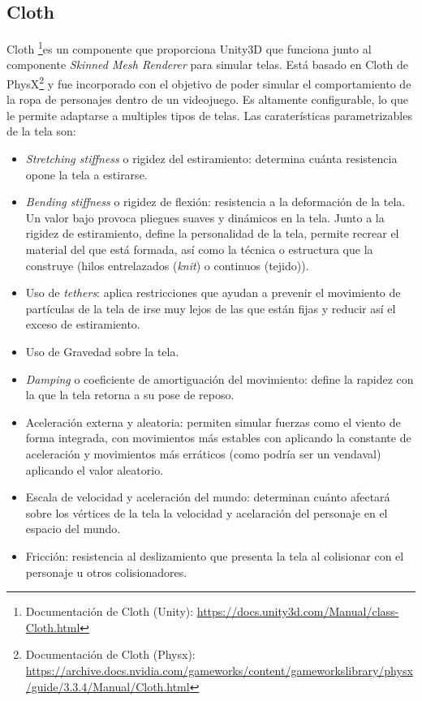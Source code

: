 \subsection{Cloth}
\label{subsec:cloth}
Cloth \footnote{Documentación de Cloth (Unity): \url{https://docs.unity3d.com/Manual/class-Cloth.html}}es un componente que proporciona Unity3D que funciona junto al componente \textit{Skinned Mesh Renderer} para simular telas. Está basado en Cloth de PhysX\footnote{Documentación de Cloth (Physx): \url{https://archive.docs.nvidia.com/gameworks/content/gameworkslibrary/physx/guide/3.3.4/Manual/Cloth.html}} y fue incorporado con el objetivo de poder simular el comportamiento de la ropa de personajes dentro de un videojuego. Es altamente configurable, lo que le permite adaptarse a multiples tipos de telas. Las caraterísticas parametrizables de la tela son: 
\begin{itemize}
  \item \textit{Stretching stiffness} o rigidez del estiramiento: determina cuánta resistencia opone la tela a estirarse.
  \item \textit{Bending stiffness} o rigidez de flexión: resistencia a la deformación de la tela. Un valor bajo provoca pliegues suaves y dinámicos en la tela. Junto a la rigidez de estiramiento, define la personalidad de la tela, permite recrear el material del que está formada, así como la técnica o estructura que la construye (hilos entrelazados (\textit{knit}) o continuos (tejido)).
  \item Uso de \textit{tethers}: aplica restricciones que ayudan a prevenir el movimiento de partículas de la tela de irse muy lejos de las que están fijas y reducir así el exceso de estiramiento.
  \item Uso de Gravedad sobre la tela.
  \item \textit{Damping} o coeficiente de amortiguación del movimiento: define la rapidez con la que la tela retorna a su pose de reposo.
  \item Aceleración externa y aleatoria: permiten simular fuerzas como el viento de forma integrada, con movimientos más estables con aplicando la constante de aceleración y movimientos más erráticos (como podría ser un vendaval) aplicando el valor aleatorio. 
  \item Escala de velocidad y aceleración del mundo: determinan cuánto afectará sobre los vértices de la tela la velocidad y acelaración del personaje en el espacio del mundo.
  \item Fricción: resistencia al deslizamiento que presenta la tela al colisionar con el personaje u otros colisionadores.

\end{itemize}
